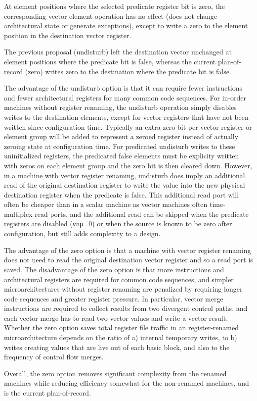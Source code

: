 At element positions where the selected predicate register bit is
zero, the corresponding vector element operation has no effect (does
not change architectural state or generate exceptions), except to
write a zero to the element position in the destination vector
register.

\begin{discussion}
  The previous proposal (undisturb) left the destination vector
  unchanged at element positions where the predicate bit is false,
  whereas the current plan-of-record (zero) writes zero to the
  destination where the predicate bit is false.

  The advantage of the undisturb option is that it can require fewer
  instructions and fewer architectural registers for many common code
  sequences.  For in-order machines without register renaming, the
  undisturb operation simply disables writes to the destination
  elements, except for vector registers that have not been written
  since configuration time. Typically an extra zero bit per vector
  register or element group will be added to represent a zeroed
  register instead of actually zeroing state at configuration time.
  For predicated undisturb writes to these uninitialized registers,
  the predicated false elements must be explicity written with zeros
  on each element group and the zero bit is then cleared down.
  However, in a machine with vector register renaming, undisturb does
  imply an additional read of the original destination register to
  write the value into the new physical destination register when the
  predicate is false.  This additional read port will often be cheaper
  than in a scalar machine as vector machines often time-multiplex
  read ports, and the additional read can be skipped when the
  predicate registers are disabled ({\tt vnp}=0) or when the source is
  known to be zero after configuration, but still adds complexity to a
  design.

  The advantage of the zero option is that a machine with vector
  register renaming does not need to read the original destination
  vector register and so a read port is saved.  The disadvantage of
  the zero option is that more instructions and architectural
  registers are required for common code sequences, and simpler
  microarchitectures without register renaming are penalized by
  requiring longer code sequences and greater register pressure.  In
  particular, vector merge instructions are required to collect
  results from two divergent control paths, and each vector merge has
  to read two vector values and write a vector result.  Whether the
  zero option saves total register file traffic in an register-renamed
  microarchitecture depends on the ratio of a) internal temporary
  writes, to b) writes creating values that are live out of each basic
  block, and also to the frequency of control flow merges.

  Overall, the zero option removes significant complexity from the
  renamed machines while reducing efficiency somewhat for the
  non-renamed machines, and is the current plan-of-record.
\end{discussion}

